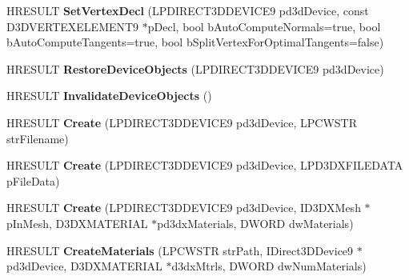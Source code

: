 \begin{DoxyCompactItemize}
\item 
\hypertarget{class_c_d_x_u_t_x_file_mesh_a66619c8be716236224622da141d94a58}{H\+R\+E\+S\+U\+L\+T {\bfseries Set\+Vertex\+Decl} (L\+P\+D\+I\+R\+E\+C\+T3\+D\+D\+E\+V\+I\+C\+E9 pd3d\+Device, const D3\+D\+V\+E\+R\+T\+E\+X\+E\+L\+E\+M\+E\+N\+T9 $\ast$p\+Decl, bool b\+Auto\+Compute\+Normals=true, bool b\+Auto\+Compute\+Tangents=true, bool b\+Split\+Vertex\+For\+Optimal\+Tangents=false)}\label{class_c_d_x_u_t_x_file_mesh_a66619c8be716236224622da141d94a58}

\item 
\hypertarget{class_c_d_x_u_t_x_file_mesh_ae5c3838a59378cdfbac2dca332eaeea3}{H\+R\+E\+S\+U\+L\+T {\bfseries Restore\+Device\+Objects} (L\+P\+D\+I\+R\+E\+C\+T3\+D\+D\+E\+V\+I\+C\+E9 pd3d\+Device)}\label{class_c_d_x_u_t_x_file_mesh_ae5c3838a59378cdfbac2dca332eaeea3}

\item 
\hypertarget{class_c_d_x_u_t_x_file_mesh_a4ab9ed6675f094296591dcc0ae2a9935}{H\+R\+E\+S\+U\+L\+T {\bfseries Invalidate\+Device\+Objects} ()}\label{class_c_d_x_u_t_x_file_mesh_a4ab9ed6675f094296591dcc0ae2a9935}

\item 
\hypertarget{class_c_d_x_u_t_x_file_mesh_abc3b28a7e913f905c86e65f90958d235}{H\+R\+E\+S\+U\+L\+T {\bfseries Create} (L\+P\+D\+I\+R\+E\+C\+T3\+D\+D\+E\+V\+I\+C\+E9 pd3d\+Device, L\+P\+C\+W\+S\+T\+R str\+Filename)}\label{class_c_d_x_u_t_x_file_mesh_abc3b28a7e913f905c86e65f90958d235}

\item 
\hypertarget{class_c_d_x_u_t_x_file_mesh_aebe7c23fdf3ef44faa6adba2d050a0b7}{H\+R\+E\+S\+U\+L\+T {\bfseries Create} (L\+P\+D\+I\+R\+E\+C\+T3\+D\+D\+E\+V\+I\+C\+E9 pd3d\+Device, L\+P\+D3\+D\+X\+F\+I\+L\+E\+D\+A\+T\+A p\+File\+Data)}\label{class_c_d_x_u_t_x_file_mesh_aebe7c23fdf3ef44faa6adba2d050a0b7}

\item 
\hypertarget{class_c_d_x_u_t_x_file_mesh_a714d8ddcde2df9840e7c48db7b37524a}{H\+R\+E\+S\+U\+L\+T {\bfseries Create} (L\+P\+D\+I\+R\+E\+C\+T3\+D\+D\+E\+V\+I\+C\+E9 pd3d\+Device, I\+D3\+D\+X\+Mesh $\ast$p\+In\+Mesh, D3\+D\+X\+M\+A\+T\+E\+R\+I\+A\+L $\ast$pd3dx\+Materials, D\+W\+O\+R\+D dw\+Materials)}\label{class_c_d_x_u_t_x_file_mesh_a714d8ddcde2df9840e7c48db7b37524a}

\item 
\hypertarget{class_c_d_x_u_t_x_file_mesh_a055b3c6720a7caf75496899017cf2c9d}{H\+R\+E\+S\+U\+L\+T {\bfseries Create\+Materials} (L\+P\+C\+W\+S\+T\+R str\+Path, I\+Direct3\+D\+Device9 $\ast$pd3d\+Device, D3\+D\+X\+M\+A\+T\+E\+R\+I\+A\+L $\ast$d3dx\+Mtrls, D\+W\+O\+R\+D dw\+Num\+Materials)}\label{class_c_d_x_u_t_x_file_mesh_a055b3c6720a7caf75496899017cf2c9d}


\end{DoxyCompactItemize}
